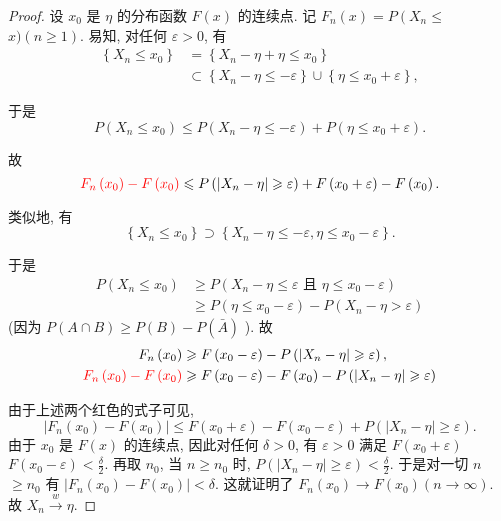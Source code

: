 \begin{proof}
    设 $x_0$ 是 $\eta$ 的分布函数 $F(x)$ 的连续点. 记 $F_n(x)=P\left(X_n \leqslant\right.$ $x)(n \geqslant 1)$. 易知, 对任何 $\varepsilon>0$, 有
$$
\begin{aligned}
\left\{X_n \leqslant x_0\right\} & =\left\{X_n-\eta+\eta \leqslant x_0\right\} \\
& \subset\left\{X_n-\eta \leqslant-\varepsilon\right\} \cup\left\{\eta \leqslant x_0+\varepsilon\right\},
\end{aligned}
$$

于是
$$
P\left(X_n \leqslant x_0\right) \leqslant P\left(X_n-\eta \leqslant-\varepsilon\right)+P\left(\eta \leqslant x_0+\varepsilon\right) .
$$

故$${{\color{red}F_n\left(x_0\right)-F\left(x_0\right)}} \leqslant P\left(\left|X_n-\eta\right| \geqslant \varepsilon\right)+F\left(x_0+\varepsilon\right)-F\left(x_0\right) .$$

类似地, 有
$$
\left\{X_n \leqslant x_0\right\} \supset\left\{X_n-\eta \leqslant-\varepsilon, \eta \leqslant x_0-\varepsilon\right\} .
$$

于是$$
\begin{aligned}
P\left(X_n \leqslant x_0\right) & \geqslant P\left(X_n-\eta \leqslant \varepsilon \text { 且 } \eta \leqslant x_0-\varepsilon\right) \\
& \geqslant P\left(\eta \leqslant x_0-\varepsilon\right)-P\left(X_n-\eta>\varepsilon\right)
\end{aligned}
$$
(因为 $P(A \cap B) \geqslant P(B)-P(\bar{A})$ ).
故
$$
\begin{aligned}
F_n\left(x_0\right) & \geqslant F\left(x_0-\varepsilon\right)-P\left(\left|X_n-\eta\right| \geqslant \varepsilon\right), \\
\color{red}F_n\left(x_0\right)-F\left(x_0\right) & \geqslant F\left(x_0-\varepsilon\right)-F\left(x_0\right)-P\left(\left|X_n-\eta\right| \geqslant \varepsilon\right)
\end{aligned}
$$

由于上述两个红色的式子可见, $$
\left|F_n\left(x_0\right)-F\left(x_0\right)\right| \leqslant F\left(x_0+\varepsilon\right)-F\left(x_0-\varepsilon\right)+P\left(\left|X_n-\eta\right| \geqslant \varepsilon\right) .
$$
由于 $x_0$ 是 $F(x)$ 的连续点, 因此对任何 $\delta>0$, 有 $\varepsilon>0$ 满足 $F\left(x_0+\varepsilon\right)$ $F\left(x_0-\varepsilon\right)<\frac{\delta}{2}$. 再取 $n_0$, 当 $n \geqslant n_0$ 时, $P\left(\left|X_n-\eta\right| \geqslant \varepsilon\right)<\frac{\delta}{2}$. 于是对一切 $n$ $\geqslant n_0$ 有 $\left|F_n\left(x_0\right)-F\left(x_0\right)\right|<\delta$. 这就证明了 $F_n\left(x_0\right) \rightarrow F\left(x_0\right)(n \rightarrow \infty)$. 故 $X_n \stackrel{w}{\longrightarrow} \eta$.
\end{proof}

